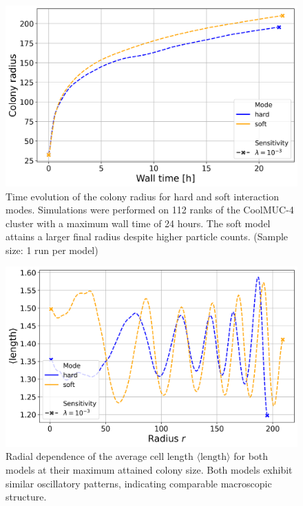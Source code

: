 \documentclass[conference]{IEEEtran}
\begin{document}
\begin{figure}[h]
    \centering
    \includegraphics[width=\linewidth]{figures/comparison_plots/huge_wall_time_vs_radius.png}
    \caption{Time evolution of the colony radius for hard and soft interaction modes. Simulations were performed on 112 ranks of the CoolMUC-4 cluster with a maximum wall time of 24 hours. The soft model attains a larger final radius despite higher particle counts. (Sample size: 1 run per model)}
    \label{fig:huge_wall_time_vs_radius}
\end{figure}

\begin{figure}[h]
    \centering
    \includegraphics[width=\linewidth]{figures/comparison_plots/huge_length_shared.png}
    \caption{Radial dependence of the average cell length $\langle \text{length} \rangle$ for both models at their maximum attained colony size. Both models exhibit similar oscillatory patterns, indicating comparable macroscopic structure.}
    \label{fig:huge_length_shared}
\end{figure}
\end{document}
